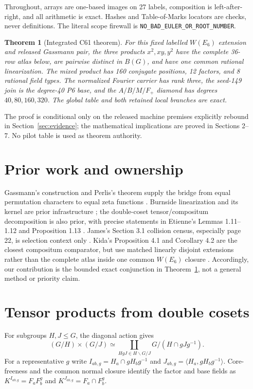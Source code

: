 \documentclass[11pt]{article}
\newtheorem{theorem}{Theorem}[section]
\begin{document}
Throughout, arrays are one-based images on 27 labels, composition is left-after-right, and
all arithmetic is exact.  Hashes and Table-of-Marks locators are checks, never definitions.
The literal scope firewall is \texttt{NO\_BAD\_EULER\_OR\_ROOT\_NUMBER}.

\begin{theorem}[Integrated C61 theorem]\label{thm:main}
For this fixed labelled $W(E_6)$ extension and released Gassmann pair, the three products
$x^2,xy,y^2$ have the complete 36-row atlas below, are pairwise distinct in $B(G)$, and
have one common rational linearization.  The mixed product has 160 conjugate positions,
12 factors, and 8 rational field types.  The normalized Fourier carrier has rank three,
the seed-149 join is the degree-40 P6 base, and the $A/B/M/F_+$ diamond has degrees
$40,80,160,320$.  The global table and both retained local branches are exact.
\end{theorem}

The proof is conditional only on the released machine premises explicitly rebound in
Section~\ref{sec:evidence}; the mathematical implications are proved in Sections 2--7.
No pilot table is used as theorem authority.

\section{Prior work and ownership}
Gassmann's construction and Perlis's theorem supply the bridge from equal permutation characters
to equal zeta functions \cite{gassmann,perlis}.  Burnside linearization and its kernel are
prior infrastructure \cite{bartel,parzanchevski,lin}; the double-coset tensor/compositum
decomposition is also prior, with precise statements in Etienne's Lemmas 1.11--1.12 and
Proposition 1.13 \cite{etienne}.  James's Section 3.1 collision census, especially page 22,
is selection context only \cite{james}.  Kida's Proposition 4.1 and Corollary 4.2 are the
closest compositum comparator, but use matched linearly disjoint extensions rather than the
complete atlas inside one common $W(E_6)$ closure \cite{kida}.  Accordingly, our contribution
is the bounded exact conjunction in Theorem~\ref{thm:main}, not a general method or priority claim.

\section{Tensor products from double cosets}
For subgroups $H,J\leq G$, the diagonal action gives
\begin{equation}
 (G/H)\times(G/J)\simeq\coprod_{HgJ\in H\backslash G/J}G/(H\cap gJg^{-1}).
\label{eq:doublecoset}
\end{equation}
For a representative $g$ write $I_{ab,g}=H_a\cap gH_bg^{-1}$ and
$J_{ab,g}=\langle H_a,gH_bg^{-1}\rangle$.  Core-freeness and the common normal closure
identify the factor and base fields as $K^{I_{ab,g}}=F_aF_b^g$ and
$K^{J_{ab,g}}=F_a\cap F_b^g$.
\end{document}
